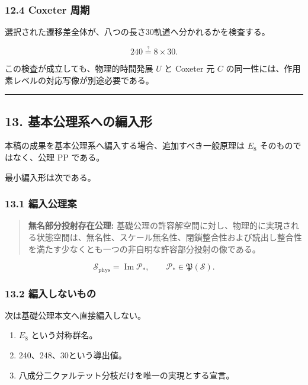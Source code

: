 \documentclass[
  a4paper,
  ja=minimal,
  xelatex,
  paragraph-mark={},
]{bxjsarticle}
\providecommand{\tightlist}{%
  \setlength{\itemsep}{0pt}\setlength{\parskip}{0pt}}
\begin{document}
\subsubsection{12.4 Coxeter 周期}\label{coxeter-ux5468ux671f}

選択された遷移差全体が、八つの長さ30軌道へ分かれるかを検査する。

\[
240
\stackrel{?}{=}
8\times30.
\]

この検査が成立しても、物理的時間発展 \(U\) と Coxeter 元 \(C\)
の同一性には、作用素レベルの対応写像が別途必要である。

\begin{center}\rule{0.5\linewidth}{0.5pt}\end{center}

\subsection{13.
基本公理系への編入形}\label{ux57faux672cux516cux7406ux7cfbux3078ux306eux7de8ux5165ux5f62}

本稿の成果を基本公理系へ編入する場合、追加すべき一般原理は \(E_8\)
そのものではなく、公理 PP である。

最小編入形は次である。

\subsubsection{13.1 編入公理案}\label{ux7de8ux5165ux516cux7406ux6848}

\begin{quote}
\textbf{無名部分投射存在公理:}
基礎公理の許容解空間に対し、物理的に実現される状態空間は、無名性、スケール無名性、閉鎖整合性および読出し整合性を満たす少なくとも一つの非自明な許容部分投射の像である。
\end{quote}

\[
\mathscr S_{\mathrm{phys}}
{}=
\operatorname{Im}\mathcal P_*,
\qquad
\mathcal P_*
\in
\mathfrak P(\mathscr S).
\]

\subsubsection{13.2
編入しないもの}\label{ux7de8ux5165ux3057ux306aux3044ux3082ux306e}

次は基礎公理本文へ直接編入しない。

\begin{enumerate}
\def\labelenumi{\arabic{enumi}.}
\tightlist
\item
  \(E_8\) という対称群名。
\item
  240、248、30という導出値。
\item
  八成分二クァルテット分枝だけを唯一の実現とする宣言。
\end{enumerate}
\end{document}
